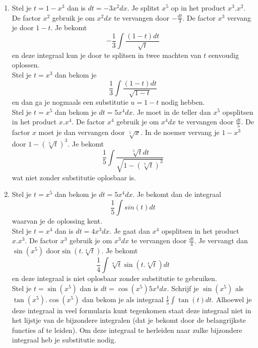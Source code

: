 \documentclass{article}
\begin{document}
\begin{enumerate}

\item

Stel je $t=1-x^3$ dan is $dt=-3x^2dx$.
Je splitst $x^5$ op in het product $x^3.x^2$.
De factor $x^2$ gebruik je om $x^2dx$ te vervangen door $-\frac{dt}{3}$.
De factor $x^3$ vervang je door $1-t$.
Je bekomt
\[
-\frac{1}{3}\int \frac{(1-t)dt}{\sqrt{t}}
\]
en deze integraal kun je door te splitsen in twee machten van $t$ eenvoudig oplossen.\\

Stel je $t=x^3$ dan bekom je
\[
\frac{1}{3}\int \frac{(1-t)dt}{\sqrt{1-t}}
\]
en dan ga je nogmaals een substitutie $ u=1-t$ nodig hebben.\\

Stel je $t=x^5$ dan bekom je $dt=5x^4dx$.
Je moet in de teller dan $x^5$ opsplitsen in het product $x.x^4$.
De factor $x^4$ gebruik je om $x^4dx$ te vervangen door $\frac{dt}{5}$.
De factor $x$ moet je dan vervangen door $\sqrt[5]{x}$.
In de noemer vervang je $1-x^3$ door $1-\left( \sqrt[5]{t}  \right)^3$.
Je bekomt
\[
\frac{1}{5} \int \frac{\sqrt[5]{t}dt}{\sqrt {1-\left(\sqrt[5]{t}  \right)^3}}
\]
wat niet zonder substitutie oplosbaar is.

\item

Stel je $t=x^5$ dan bekom je $dt=5x^4dx$.
Je bekomt dan de integraal
\[
\frac{1}{5} \int sin (t)dt
\]
waarvan je de oplossing kent.\\

Stel je $t=x^4$ dan is $dt=4x^3dx$.
Je gaat dan $x^4$ opsplitsen in het product $x.x^3$.
De factor $x^3$ gebruik je om $x^3dx$ te vervangen door $\frac {dt}{4}$.
Je vervangt dan $\sin \left( x^5 \right)$ door$\sin \left( t.\sqrt[4]{t} \right)$.
Je bekomt
\[
\frac{1}{4} \int \sqrt[4]{t}\sin \left( t.\sqrt[4]{t} \right)dt
\]
en deze integraal is niet oplosbaar zonder substitutie te gebruiken.\\

Stel je $t=\sin \left( x^5 \right)$ dan is $dt=\cos \left( x^5 \right)5x^4 dx$.
Schrijf je $\sin \left( x^5 \right)$ als $\tan \left( x^5 \right).\cos \left( x^5 \right)$ dan bekom je als integraal $\frac{1}{5} \int \tan (t)dt$.
Alhoewel je deze integraal in veel formularia kunt tegenkomen staat deze integraal niet in het lijstje van de bijzondere integralen (dat je bekomt door de belangrijkste functies af te leiden).
Om deze integraal te herleiden naar zulke bijzondere integraal heb je substitutie nodig.


\end{enumerate}
\end{document}
